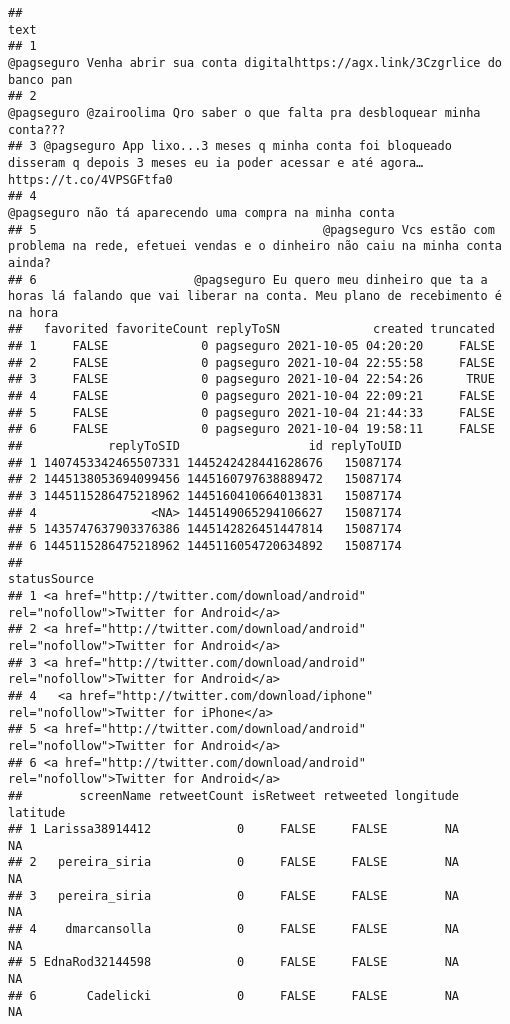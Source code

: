\documentclass[
]{article}
\begin{document}
\begin{verbatim}
##                                                                                                                                           text
## 1                                                              @pagseguro Venha abrir sua conta digitalhttps://agx.link/3Czgrlice do banco pan
## 2                                                                  @pagseguro @zairoolima Qro saber o que falta pra desbloquear minha conta???
## 3 @pagseguro App lixo...3 meses q minha conta foi bloqueado disseram q depois 3 meses eu ia poder acessar e até agora… https://t.co/4VPSGFtfa0
## 4                                                                                       @pagseguro não tá aparecendo uma compra na minha conta
## 5                                        @pagseguro Vcs estão com problema na rede, efetuei vendas e o dinheiro não caiu na minha conta ainda?
## 6                      @pagseguro Eu quero meu dinheiro que ta a horas lá falando que vai liberar na conta. Meu plano de recebimento é na hora
##   favorited favoriteCount replyToSN             created truncated
## 1     FALSE             0 pagseguro 2021-10-05 04:20:20     FALSE
## 2     FALSE             0 pagseguro 2021-10-04 22:55:58     FALSE
## 3     FALSE             0 pagseguro 2021-10-04 22:54:26      TRUE
## 4     FALSE             0 pagseguro 2021-10-04 22:09:21     FALSE
## 5     FALSE             0 pagseguro 2021-10-04 21:44:33     FALSE
## 6     FALSE             0 pagseguro 2021-10-04 19:58:11     FALSE
##            replyToSID                  id replyToUID
## 1 1407453342465507331 1445242428441628676   15087174
## 2 1445138053694099456 1445160797638889472   15087174
## 3 1445115286475218962 1445160410664013831   15087174
## 4                <NA> 1445149065294106627   15087174
## 5 1435747637903376386 1445142826451447814   15087174
## 6 1445115286475218962 1445116054720634892   15087174
##                                                                           statusSource
## 1 <a href="http://twitter.com/download/android" rel="nofollow">Twitter for Android</a>
## 2 <a href="http://twitter.com/download/android" rel="nofollow">Twitter for Android</a>
## 3 <a href="http://twitter.com/download/android" rel="nofollow">Twitter for Android</a>
## 4   <a href="http://twitter.com/download/iphone" rel="nofollow">Twitter for iPhone</a>
## 5 <a href="http://twitter.com/download/android" rel="nofollow">Twitter for Android</a>
## 6 <a href="http://twitter.com/download/android" rel="nofollow">Twitter for Android</a>
##        screenName retweetCount isRetweet retweeted longitude latitude
## 1 Larissa38914412            0     FALSE     FALSE        NA       NA
## 2   pereira_siria            0     FALSE     FALSE        NA       NA
## 3   pereira_siria            0     FALSE     FALSE        NA       NA
## 4    dmarcansolla            0     FALSE     FALSE        NA       NA
## 5 EdnaRod32144598            0     FALSE     FALSE        NA       NA
## 6       Cadelicki            0     FALSE     FALSE        NA       NA
\end{verbatim}
\end{document}
